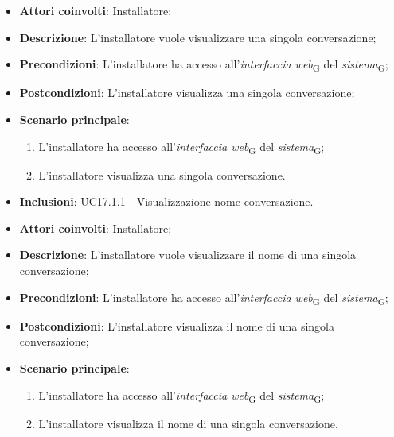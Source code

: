 \begin{itemize}
    \item \textbf{Attori coinvolti}: Installatore;
    \item \textbf{Descrizione}: L'installatore vuole visualizzare una singola conversazione;
    \item \textbf{Precondizioni}: L’installatore ha accesso all’\textit{interfaccia web}\textsubscript{G} del \textit{sistema}\textsubscript{G};
    \item \textbf{Postcondizioni}: L'installatore visualizza una singola conversazione;
    \item \textbf{Scenario principale}:
    \begin{enumerate}
        \item L’installatore ha accesso all’\textit{interfaccia web}\textsubscript{G} del \textit{sistema}\textsubscript{G};
        \item L'installatore visualizza una singola conversazione.
    \end{enumerate}
    \item \textbf{Inclusioni}: UC17.1.1 - Visualizzazione nome conversazione.
\end{itemize}

\begin{itemize}
    \item \textbf{Attori coinvolti}: Installatore;
    \item \textbf{Descrizione}: L'installatore vuole visualizzare il nome di una singola conversazione;
    \item \textbf{Precondizioni}: L’installatore ha accesso all’\textit{interfaccia web}\textsubscript{G} del \textit{sistema}\textsubscript{G};
    \item \textbf{Postcondizioni}: L'installatore visualizza il nome di una singola conversazione;
    \item \textbf{Scenario principale}:
    \begin{enumerate}
        \item L’installatore ha accesso all’\textit{interfaccia web}\textsubscript{G} del \textit{sistema}\textsubscript{G};
        \item L'installatore visualizza il nome di una singola conversazione.
    \end{enumerate}
\end{itemize}



